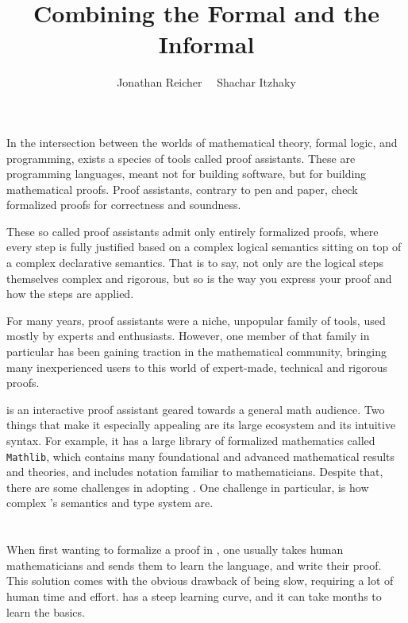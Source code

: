 \documentclass{article}
\makeatletter
\newcommand{\code}{\texttt}
\newcommand{\mathlib}{\code{Mathlib}\xspace}
\let\oldsection\section
\renewcommand{\section}{\@ifstar\customsectionstar\customsectionnostar}
\newcommand{\customsectionstar}[1]{\oldsection*{\large#1}\vspace{-0.5em}}
\newcommand{\customsectionnostar}[1]{\oldsection*{\large#1}\vspace{-0.5em}}
\makeatother
\begin{document}
\title{Combining the Formal and the Informal}
\author{Jonathan Reicher \ \ Shachar Itzhaky}
\maketitle

\section{Problem Statement}
In the intersection between the worlds of mathematical theory, formal logic,
and programming, exists a species of tools called proof assistants.
These are programming languages, meant not for building software, but for
building mathematical proofs.
Proof assistants, contrary to pen and paper, check formalized proofs for
correctness and soundness.

These so called proof assistants admit only entirely formalized proofs, where
every step is fully justified based on a complex logical semantics sitting on
top of a complex declarative semantics. That is to say, not only are the logical
steps themselves complex and rigorous, but so is the way you express your proof
and how the steps are applied.

For many years, proof assistants were a niche, unpopular family of tools, used
mostly by experts and enthusiasts. However, one member of that family in
particular has been gaining traction in the mathematical community, bringing
many inexperienced users to this world of expert-made, technical and rigorous
proofs.

\lean \cite{10.1007/978-3-030-79876-5_37} is an interactive proof assistant geared towards a general
math audience.
Two things that make it especially appealing are its large ecosystem and its
intuitive syntax.
For example, it has a large library of formalized mathematics called
\mathlib, which contains many foundational and advanced mathematical
results and theories, and includes notation familiar to mathematicians.
Despite that, there are some challenges in adopting \lean. One challenge in
particular, is how complex \lean's semantics and type system are.

\section{Existing Solutions}
When first wanting to formalize a proof in \lean, one usually takes human
mathematicians and sends them to learn the language, and write their proof. This
solution comes with the obvious drawback of being slow, requiring a lot of human
time and effort. \lean has a steep learning curve, and it can take months to
learn the basics.
\end{document}
